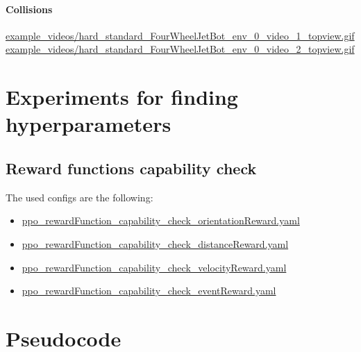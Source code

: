 \paragraph{Collisions}
\label{sec:fourwheel_collisions}

\href{https://huggingface.co/geschnee/carsim-rl-cnn/blob/main/example_videos_FourWheelJetbot/hard_standard_FourWheelJetBot_env_0_video_1_topview.gif}{example\_videos/hard\_standard\_FourWheelJetBot\_env\_0\_video\_1\_topview.gif}
\href{https://huggingface.co/geschnee/carsim-rl-cnn/blob/main/example_videos_FourWheelJetbot/hard_standard_FourWheelJetBot_env_0_video_2_topview.gif}{example\_videos/hard\_standard\_FourWheelJetBot\_env\_0\_video\_2\_topview.gif}




\section{Experiments for finding hyperparameters}

\subsection{Reward functions capability check}
The used configs are the following:
\begin{itemize}
    \item \href{https://github.com/geschnee/carsim-rl-cnn/tree/main/python/cfg/ppo_rewardFunction_capability_check_orientationReward.yaml}{ppo\_rewardFunction\_capability\_check\_orientationReward.yaml}
    \item \href{https://github.com/geschnee/carsim-rl-cnn/tree/main/python/cfg/ppo_rewardFunction_capability_check_distanceReward.yaml}{ppo\_rewardFunction\_capability\_check\_distanceReward.yaml}
    \item \href{https://github.com/geschnee/carsim-rl-cnn/tree/main/python/cfg/ppo_rewardFunction_capability_check_velocityReward.yaml}{ppo\_rewardFunction\_capability\_check\_velocityReward.yaml}
    \item \href{https://github.com/geschnee/carsim-rl-cnn/tree/main/python/cfg/ppo_rewardFunction_capability_check_eventReward.yaml}{ppo\_rewardFunction\_capability\_check\_eventReward.yaml}
\end{itemize}



\section{Pseudocode}

